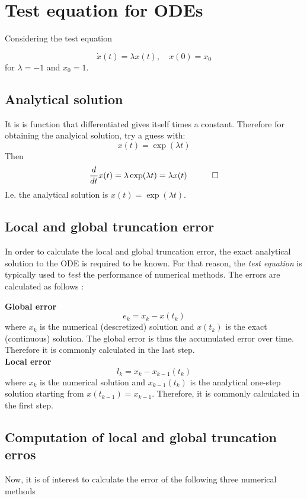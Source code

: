 \section{Test equation for ODEs}
Considering the test equation

$$
\dot{x}(t)=\lambda x(t), \quad x(0)=x_{0} \label{eq:test}
$$
for $\lambda=-1$ and $x_{0}=1$.

\subsection{Analytical solution}
It is is function that differentiated gives itself times a constant. Therefore for obtaining the analyical solution, try a guess with:
$$
x(t) = \exp(\lambda t)
$$
Then
$$
\frac{d}{dt}x(t) = \lambda \exp(\lambda t) = \lambda x(t)  \quad \qed
$$
I.e. the analytical solution is $x(t) = \exp(\lambda t)$.

\subsection{Local and global truncation error}
In order to calculate the local and global truncation error, the exact analytical solution to the ODE is required to be known. For that reason, the \textit{test equation} is typically used to \textit{test} the performance of numerical methods. The errors are calculated as follows \cite{JrgensenScientificEquations}:

\textbf{Global error}
$$
e_{k}=x_{k}-x\left(t_{k}\right)
$$
where $x_{k}$ is the numerical (descretized) solution and $x\left(t_{k}\right)$ is the exact (continuous) solution. The global error is thus the accumulated error over time. Therefore it is commonly calculated in the last step.
\\

\textbf{Local error}
$$
l_{k}=x_{k}-x_{k-1}\left(t_{k}\right)
$$
where $x_{k}$ is the numerical solution and $x_{k-1}\left(t_{k}\right)$ is the analytical one-step solution starting from $x\left(t_{k-1}\right)=x_{k-1}$. Therefore, it is commonly calculated in the first step.
\\

\subsection{Computation of local and global truncation erros}

Now, it is of interest to calculate the error of the following three numerical methods
\\

